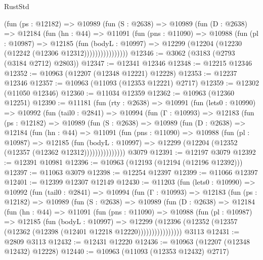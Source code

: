\begin{lexlean}{RustStd}
\begin{coremodule}
              (fun (ps : @12182) =>
              @10989
                (fun (S : @2638) =>
                @10989
                  (fun (D : @2638) =>
                  @12184
                    (fun (hn : @44) =>
                    @11091
                      (fun (pns : @11090) =>
                      @10988
                        (fun (pl : @10987) =>
                        @12185
                          (fun (bodyL : @10997) =>
                          @12299 (@12204 (@12230 (@12242 (@12306 @12312))))))))))))))))
@12346 := @3062 (@3183 (@2793 (@3184 @2712) @2803))
@12347 := @12341 @12346
@12348 := @12215 @12346
@12352 := @10963 (@12207 (@12348 @12221) @12228)
@12353 := @12237 @12346
@12357 := @10963 (@11093 (@12353 @12221) @2717)
@12359 := @12302 (@11050 @12346)
@12360 := @11034 @12359
@12362 := @10963 (@12360 @12251)
@12390 := @11181
    (fun (rty : @2638) =>
    @10991
      (fun (lets0 : @10990) =>
      @10992
        (fun (tail0 : @2841) =>
        @10994
          (fun (Γ : @10993) =>
          @12183
            (fun (ps : @12182) =>
            @10989
              (fun (S : @2638) =>
              @10989
                (fun (D : @2638) =>
                @12184
                  (fun (hn : @44) =>
                  @11091
                    (fun (pns : @11090) =>
                    @10988
                      (fun (pl : @10987) =>
                      @12185
                        (fun (bodyL : @10997) =>
                        @12299 (@12204 (@12352 (@12357 (@12362 @12312)))))))))))))))
    @3079
@12391 := @12197 @3079
@12392 := @12391 @10981
@12396 := @10963 (@12193 (@12194 (@12196 @12392)))
@12397 := @11063 @3079
@12398 := @12254 @12397
@12399 := @11066 @12397
@12401 := @12399 @12307 @12149
@12430 := @11203
    (fun (lets0 : @10990) =>
    @10992
      (fun (tail0 : @2841) =>
      @10994
        (fun (Γ : @10993) =>
        @12183
          (fun (ps : @12182) =>
          @10989
            (fun (S : @2638) =>
            @10989
              (fun (D : @2638) =>
              @12184
                (fun (hn : @44) =>
                @11091
                  (fun (pns : @11090) =>
                  @10988
                    (fun (pl : @10987) =>
                    @12185
                      (fun (bodyL : @10997) =>
                      @12299
                        (@12396
                          (@12352 (@12357 (@12362 (@12398 (@12401 @12218 @12220))))))))))))))))
    @3113
@12431 := @2809 @3113
@12432 := @12431 @12220
@12436 := @10963 (@12207 (@12348 @12432) @12228)
@12440 := @10963 (@11093 (@12353 @12432) @2717)

\end{coremodule}
\end{lexlean}

